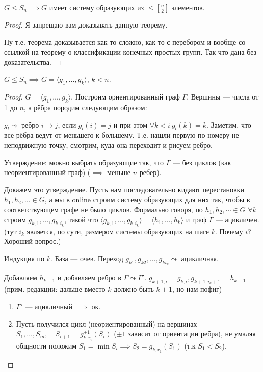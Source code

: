 \begin{theorem}
    $G \le S_n \implies G$ имеет систему образующих из $\le \left[ \frac{n}{2} \right]$ элементов.
\end{theorem}
\begin{proof}
    Я запрещаю вам доказывать данную теорему.

    Ну т.е. теорема доказывается как-то сложно, как-то с перебором и вообще со ссылкой на теорему о классификации конечных простых групп. Так что дана без доказательства.
\end{proof}
\begin{theorem}
    $G \le S_n \implies G = \langle g_1, \ldots, g_k \rangle$, $k < n$.
\end{theorem}
\begin{proof}
    $G = \langle g_1, \ldots, g_k\rangle$. Построим ориентированный граф $\Gamma$. Вершины --- числа от 1 до $n$, а рёбра породим следующим образом:

    $g_l \leadsto$ ребро  $i \to j$, если  $g_l(i) = j$ и при этом $\forall k < i \ g_l(k) = k$. Заметим, что все рёбра ведут от меньшего к большему. Т.е. нашли первую по номеру не неподвижную точку, смотрим, куда она переходит и рисуем ребро.

    Утверждение: можно выбрать образующие так, что $\Gamma$ --- без циклов (как неориентированный граф) ($\implies$ меньше $n$ ребер).

    Докажем это утверждение. Пусть нам последовательно кидают перестановки $h_1, h_2, \ldots \in G$, а мы в online строим систему образующих для них так, чтобы в соответствующем графе не было циклов. Формально говоря, по $h_1, h_2, \cdots \in G$ $\forall k$ строим  $g_{k,1}, \ldots, g_{k, i_k}$, такой что $\langle g_{k,1}, \ldots, g_{k, i_k} \rangle  = \langle h_1, \ldots, h_k \rangle$ и граф $\Gamma$ --- ацикличен. (тут $i_k$ является, по сути, размером системы образующих на шаге $k$. Почему $i$? Хороший вопрос.)

    Индукция по $k$. База --- очев. Переход  $g_{k1}, g_{k 2}, \ldots, g_{k i_k} \leadsto$ ацикличная.

    Добавляем $h_{k+1}$ и добавляем ребро в $\Gamma \leadsto \Gamma'$. $g_{k+1, i} = g_{k, i}, g_{k+1, i_{k} + 1} = h_{k+1}$ (прим. редакции: дальше вместо $k$ должно быть $k+1$, но нам пофиг)
    \begin{enumerate}
        \item $\Gamma'$ --- ацикличный $\implies$ ок.

        \item
            Пусть получился цикл (неориентированный) на вершинах $S_1, \ldots, S_m, \quad S_{i+1} = g_{k, r_i}^{\pm 1}(S_i)$ ($\pm 1$ зависит от ориентации ребра), не умаляя общности положим $S_1 = \min S_i \implies S_2 = g_{k,r_1}(S_1)$ (т.к $S_1 < S_2$).


\end{enumerate}
\end{proof}
